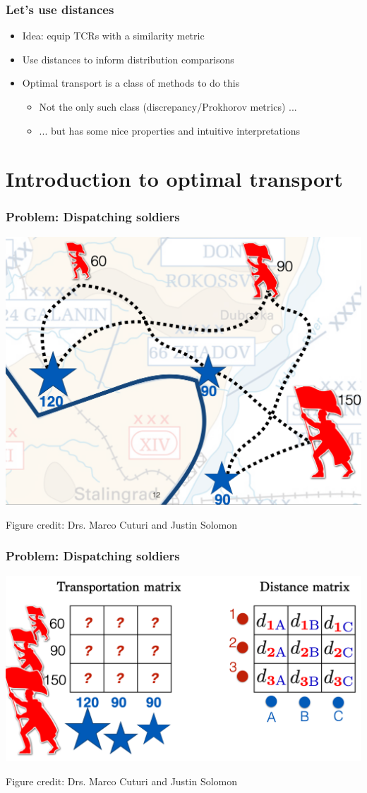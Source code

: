 \documentclass[mathserif,compress,xcolor={dvipsnames}]{beamer}
\renewcommand\;{\,}
\begin{document}
\begin{frame}\frametitle{Let's use distances}
\begin{itemize}
\item
Idea: equip TCRs with a similarity metric
\bigskip
\item
Use distances to inform distribution comparisons
\bigskip
\item
Optimal transport is a class of methods to do this
\bigskip
\begin{itemize}
\item
Not the only such class (discrepancy/Prokhorov metrics) ...
\bigskip
\item
... but has some nice properties and intuitive interpretations
\end{itemize}
\end{itemize}
\end{frame}

\section{Introduction to optimal transport}



\begin{frame}\frametitle{Problem: Dispatching soldiers}
\begin{center}
\includegraphics[width=0.8\linewidth]{Images/soldiers.png}
\end{center}
{\scriptsize * Figure credit: Drs. Marco Cuturi and Justin Solomon}
\end{frame}

\begin{frame}\frametitle{Problem: Dispatching soldiers}
\begin{center}
\includegraphics[width=0.8\linewidth]{Images/soldiers_as_OT.png}
\end{center}
{\scriptsize * Figure credit: Drs. Marco Cuturi and Justin Solomon}
\end{frame}
\end{document}
